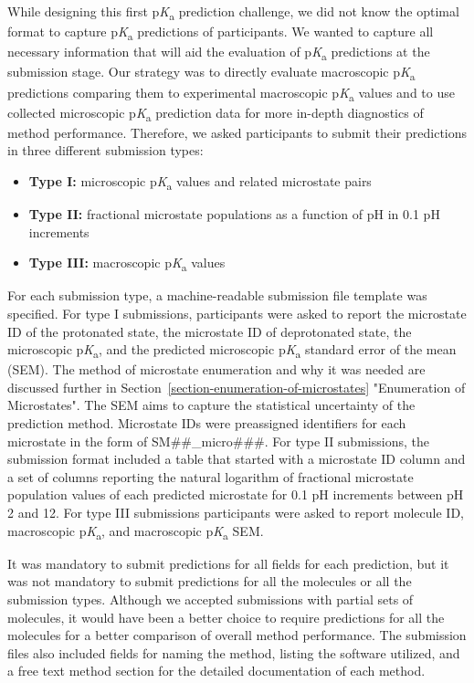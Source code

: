 \documentclass[9pt,lineno,final]{elife}
\newcommand{\pKa}{p\textit{K}\textsubscript{a}}
\begin{document}
While designing this first \pKa{} prediction challenge, we did not know the optimal format to capture \pKa{} predictions of participants. 
We wanted to capture all necessary information that will aid the evaluation of \pKa{} predictions at the submission stage. 
Our strategy was to directly evaluate macroscopic \pKa{} predictions comparing them to experimental macroscopic \pKa{} values and to use collected microscopic \pKa{} prediction data for more in-depth diagnostics of method performance.
Therefore, we asked participants to submit their predictions in three different submission types: 
\begin{itemize}
\item {\bf Type I:} microscopic \pKa{} values and related microstate pairs
\item {\bf Type II:} fractional microstate populations as a function of pH in 0.1 pH increments
\item {\bf Type III:} macroscopic \pKa{} values
\end{itemize}

For each submission type, a machine-readable submission file template was specified. 
For type I submissions, participants were asked to report the microstate ID of the protonated state, the microstate ID of deprotonated state, the microscopic \pKa{}, and the predicted microscopic \pKa{} standard error of the mean (SEM).  
The method of microstate enumeration and why it was needed are discussed further in Section~\ref{section-enumeration-of-microstates} "Enumeration of Microstates".
The SEM aims to capture the statistical uncertainty of the prediction method. 
Microstate IDs were preassigned identifiers for each microstate in the form of SM\#\#\_micro\#\#\#. 
For type II submissions, the submission format included a table that started with a microstate ID column and a set of columns reporting the natural logarithm of fractional microstate population values of each predicted microstate for 0.1 pH increments between pH 2 and 12.
For type III submissions participants were asked to report molecule ID, macroscopic \pKa{}, and macroscopic \pKa{} SEM.  

It was mandatory to submit predictions for all fields for each prediction, but it was not mandatory to submit predictions for all the molecules or all the submission types. 
Although we accepted submissions with partial sets of molecules, it would have been a better choice to require predictions for all the molecules for a better comparison of overall method performance. 
The submission files also included fields for naming the method, listing the software utilized, and a free text method section for the detailed documentation of each method. 
\end{document}
